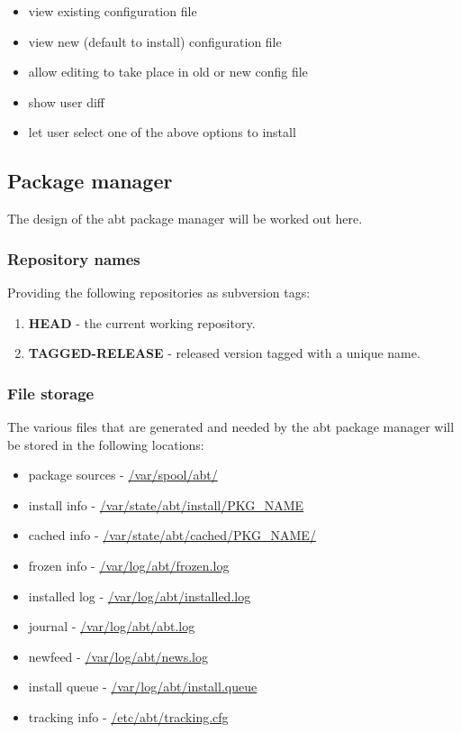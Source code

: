 \begin{itemize}
  \item view existing configuration file
  \item view new (default to install) configuration file
  \item allow editing to take place in old or new config file
  \item show user diff
  \item let user select one of the above options to install
\end{itemize}


\subsection{Package manager}
The design of the abt package manager will be worked out here.

\subsubsection{Repository names}
Providing the following repositories as subversion tags:

\begin{enumerate}
  \item \textbf{HEAD} - the current working repository.
  \item \textbf{TAGGED-RELEASE} - released version tagged with a unique name.
\end{enumerate}

\subsubsection{File storage}
The various files that are generated and needed by the abt package manager will be stored in the following locations:

\begin{itemize}
  \item package sources - \url{/var/spool/abt/}
  \item install info - \url{/var/state/abt/install/PKG_NAME}
  \item cached info - \url{/var/state/abt/cached/PKG_NAME/}
  \item frozen info - \url{/var/log/abt/frozen.log}
  \item installed log - \url{/var/log/abt/installed.log}
  \item journal - \url{/var/log/abt/abt.log}
  \item newfeed - \url{/var/log/abt/news.log}
  \item install queue - \url{/var/log/abt/install.queue}
  \item tracking info - \url{/etc/abt/tracking.cfg}
\end{itemize}
